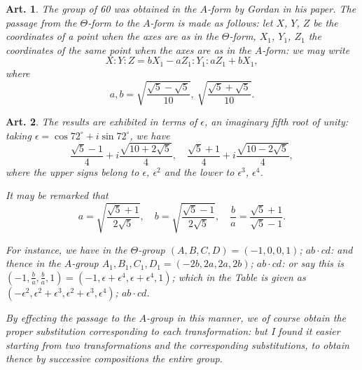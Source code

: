 \documentclass[11pt,a4paper]{article}
\theoremstyle{plain}
\newtheorem{art}{Art.}[section]
\begin{document}
\begin{art}
The group of 60 was obtained in the $A$-form by Gordan in his paper.
The passage from the $\Theta$-form to the $A$-form is made as follows: let
$X$, $Y$, $Z$ be the coordinates of a point when the axes are as in the
$\Theta$-form, $X_1$, $Y_1$, $Z_1$ the coordinates of the same point when the axes
are as in the $A$-form: we may write
\[
X : Y : Z = bX_1 - aZ_1 : Y_1 : aZ_1 + bX_1,
\]
where
\[
a, b = \sqrt{\frac{\sqrt{5}-\sqrt{5}}{10}},\ \sqrt{\frac{\sqrt{5}+\sqrt{5}}{10}}.
\]
\end{art}

\begin{art}
The results are exhibited in terms of $\epsilon$, an imaginary fifth root of
unity: taking $\epsilon = \cos 72^\circ + i\sin 72^\circ$, we have
\[
\frac{\sqrt{5}-1}{4} + i\frac{\sqrt{10+2\sqrt{5}}}{4}, \quad
\frac{\sqrt{5}+1}{4} + i\frac{\sqrt{10-2\sqrt{5}}}{4},
\]
where the upper signs belong to $\epsilon$, $\epsilon^2$ and the lower to $\epsilon^3$, $\epsilon^4$.

It may be remarked that
\[
a = \sqrt{\frac{\sqrt{5}+1}{2\sqrt{5}}}, \quad b = \sqrt{\frac{\sqrt{5}-1}{2\sqrt{5}}}, \quad
\frac{b}{a} = \frac{\sqrt{5}+1}{\sqrt{5}-1}.
\]

For instance, we have in the $\Theta$-group $(A, B, C, D) = (-1, 0, 0, 1)$;
$ab \cdot cd$: and thence in the $A$-group $A_1, B_1, C_1, D_1 = (-2b, 2a, 2a, 2b)$;
$ab \cdot cd$: or say this is $(-1, \frac{b}{a}, \frac{b}{a}, 1) = (-1, \epsilon + \epsilon^4, \epsilon + \epsilon^4, 1)$; which in the Table
is given as $(-\epsilon^2, \epsilon^2 + \epsilon^3, \epsilon^2 + \epsilon^3, \epsilon^4)$; $ab \cdot cd$.

By effecting the passage to the $A$-group in this manner, we of course
obtain the proper substitution corresponding to each transformation: but
I found it easier starting from two transformations and the corresponding
substitutions, to obtain thence by successive compositions the entire group.
\end{art}
\end{document}
